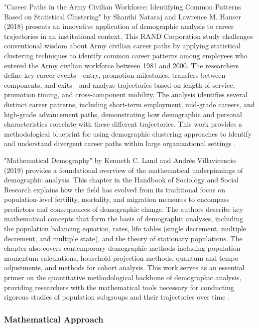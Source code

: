 \documentclass[../main.tex]{subfiles}
\begin{document}
"Career Paths in the Army Civilian Workforce: Identifying Common Patterns Based on Statistical Clustering" by Shanthi Nataraj and Lawrence M. Hanser (2018) presents an innovative application of demographic analysis to career trajectories in an institutional context. This RAND Corporation study challenges conventional wisdom about Army civilian career paths by applying statistical clustering techniques to identify common career patterns among employees who entered the Army civilian workforce between 1981 and 2000. The researchers define key career events—entry, promotion milestones, transfers between components, and exits—and analyze trajectories based on length of service, promotion timing, and cross-component mobility. The analysis identifies several distinct career patterns, including short-term employment, mid-grade careers, and high-grade advancement paths, demonstrating how demographic and personal characteristics correlate with these different trajectories. This work provides a methodological blueprint for using demographic clustering approaches to identify and understand divergent career paths within large organizational settings \parencite{nataraj2018career}.

"Mathematical Demography" by Kenneth C. Land and Andrés Villavicencio (2019) provides a foundational overview of the mathematical underpinnings of demographic analysis. This chapter in the Handbook of Sociology and Social Research explains how the field has evolved from its traditional focus on population-level fertility, mortality, and migration measures to encompass predictors and consequences of demographic change. The authors describe key mathematical concepts that form the basis of demographic analyses, including the population balancing equation, rates, life tables (single decrement, multiple decrement, and multiple state), and the theory of stationary populations. The chapter also covers contemporary demographic methods including population momentum calculations, household projection methods, quantum and tempo adjustments, and methods for cohort analysis. This work serves as an essential primer on the quantitative methodological backbone of demographic analysis, providing researchers with the mathematical tools necessary for conducting rigorous studies of population subgroups and their trajectories over time \parencite{land2019mathematical,vanwissen2016dissertation}.

\subsubsection{Mathematical Approach}
\end{document}
